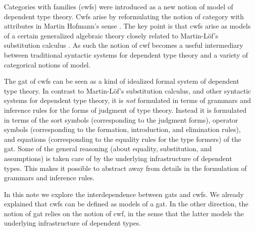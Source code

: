 \documentclass{lmcs}
\newcommand{\FYI}[1]{{\color{red}#1}}
\def\Cwf{\mathbf{CwF}}
\begin{document}
Categories with families (cwfs) \cite{dybjer:torino} were introduced as a new notion of model of dependent type theory. Cwfs arise by reformulating the notion of category with attributes in Martin Hofmann's sense \cite{hofmann:csl}. The key point is that cwfs arise as models of a certain generalized algebraic theory closely related to Martin-Löf's substitution calculus \cite{martinlof:gbg92}. As such the notion of cwf becomes a useful intermediary between traditional syntactic systems for dependent type theory and a variety of categorical notions of model.

The gat of cwfs can be seen as a kind of idealized formal system of dependent type theory. In contrast to Martin-Löf's substitution calculus, and other syntactic systems for dependent type theory, it is {\em not} formulated in terms of grammars and inference rules for the forms of judgment of type theory. Instead it is formulated in terms of the sort symbols (corresponding to the judgment forms), operator symbols (corresponding to the formation, introduction, and elimination rules), and equations (corresponding to the equality rules for the type formers) of the gat. Some of the general reasoning (about equality, substitution, and assumptions) is taken care of by the underlying infrastructure of dependent types. This makes it possible to abstract away from details in the formulation of grammars and inference rules.

In this note we explore the interdependence between gats and cwfs. We already explained that cwfs can be defined as models of a gat.
In the other direction, the notion of gat relies on the notion of cwf, in the sense that the latter models the underlying infrastructure of dependent types.

\end{document}
